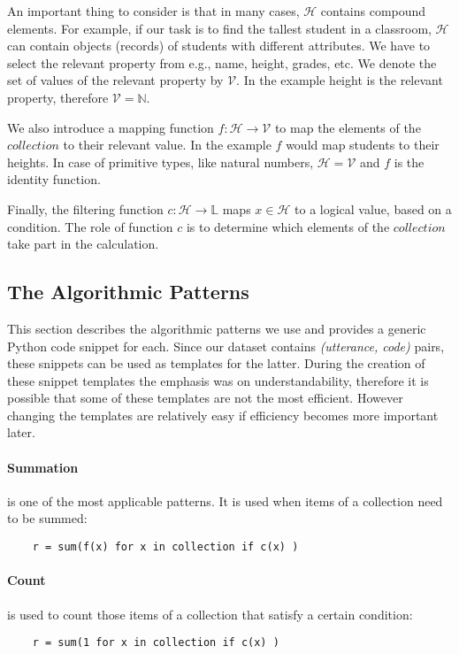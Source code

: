 An important thing to consider is that in many cases, \( \mathcal{H} \) contains
compound elements. For example, if our task is to find the tallest student in a
classroom, \( \mathcal{H} \) can contain objects (records) of students with
different attributes. We have to select the relevant property from e.g., name,
height, grades, etc. We denote the set of values of the relevant property by
\( \mathcal{V} \). In the example height is the relevant property, therefore
\( \mathcal{V} = \mathbb{N} \).

We also introduce a mapping function \( f: \mathcal{H} \to \mathcal{V} \) to map
the elements of the \( collection \) to their relevant value. In the example
\( f \) would map students to their heights. In case of primitive types, like
natural numbers, \( \mathcal{H} = \mathcal{V} \) and \( f \) is the identity
function.

Finally, the filtering function \( c: \mathcal{H} \to \mathbb{L}\) maps
\( x \in \mathcal{H} \) to a logical value, based on a condition. The role of
function \( c \) is to determine which elements of the \( collection \) take
part in the calculation.

\subsection{The Algorithmic Patterns}

This section describes the algorithmic patterns we use and provides a generic
Python code snippet for each. Since our dataset contains \emph{(utterance, code)}
pairs, these snippets can be used as templates for the latter. During the
creation of these snippet templates the emphasis was on understandability,
therefore it is possible that some of these templates are not the most
efficient. However changing the templates are relatively easy if efficiency
becomes more important later.

\paragraph{Summation}\label{sec:sum}
is one of the most applicable patterns\cite{Sum}. It is used when items of a
collection need to be summed:
\begin{listing}[H]
\begin{verbatim}
    r = sum(f(x) for x in collection if c(x) )
\end{verbatim}
\end{listing}


\paragraph{Count}
is used to count those items of a collection that satisfy a certain condition:
\begin{listing}[H]
\begin{verbatim}
    r = sum(1 for x in collection if c(x) )
\end{verbatim}
\end{listing}

